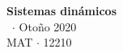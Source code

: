 \documentclass[8pt,a4paper]{extarticle}
\renewcommand{\csClass}{Sistemas dinámicos}
\renewcommand{\csClassCode}{MAT $\cdot$ 12210}
\renewcommand{\csTerm}{Otoño 2020}
\begin{document}
\begin{titlepage}
    \begin{center}
	\vspace*{1cm}
	\Huge
    \textbf{\csClass}
	\vspace{0.5cm} \\
	\Large
    \cs\ $\cdot$ \csTerm
    \vfill
    \csAuthorName\\
	\vspace{0.8cm}
    \csClassCode\\
    \csSchool
    \end{center}
\end{titlepage}

\begin{multicols}{3}
\setcounter{page}{1}

\vfill\eject
\columnbreak
\end{multicols}
\end{document}
